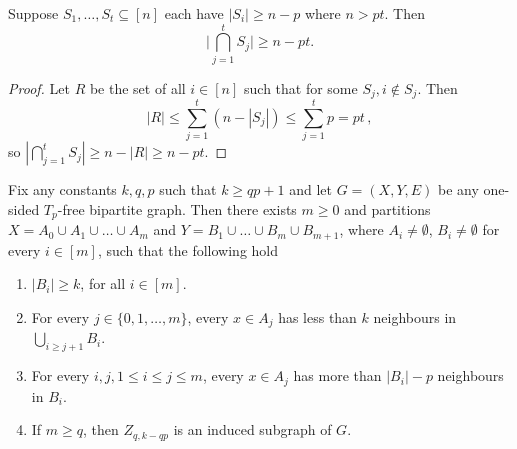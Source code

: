 \documentclass{theoretics}
\begin{document}
\begin{proposition}
\label{prop:intersections}
Suppose $S_1, \dotsc, S_t \subseteq [n]$ each have $|S_i| \geq n-p$ where $n > pt$. Then
\[\Bigg|\bigcap_{j =1}^t S_j\Bigg| \geq n-pt.\]
\end{proposition}
\begin{proof}
Let $R$ be the set of all $i \in [n]$ such that for some $S_j, i \notin S_j$. Then
\[
  |R| \leq \sum_{j=1}^t (n - |S_j|) \leq \sum_{j=1}^t p = pt \,,
\]
so $\left|\bigcap_{j=1}^t S_j\right| \geq n-|R| \geq n-pt$.
\end{proof}


\begin{lemma}
\label{lemma:tp free structure}
Fix any constants $k,q,p$ such that $k \geq qp+1$ and let $G = (X,Y,E)$ be any one-sided $T_p$-free bipartite graph. %
Then there exists $m \geq 0$ and partitions $X =A_0 \cup  A_1 \cup \ldots \cup A_m$ and
$Y = B_1 \cup \ldots \cup B_m \cup B_{m+1}$, where $A_i \neq \emptyset$, $B_i \neq \emptyset$
for every $i \in [m]$, such that the following hold
\begin{enumerate}[label=\textup{(\arabic*)}]
	\item $|B_i| \geq k$, for all $i \in [m]$.
	\item For every $j \in \{0,1, \ldots, m\}$, every $x \in A_j$ has less than $k$ neighbours in $\bigcup_{i \geq j+1} B_i$.
	\item For every $i,j, 1 \leq i \leq j \leq m$, every $x \in A_j$ has more than $|B_i| - p$ neighbours in $B_i$.
	\item If $m \geq q$, then $Z_{q,k-qp}$ is an induced subgraph of $G$.
\end{enumerate}
\end{lemma}
\end{document}
